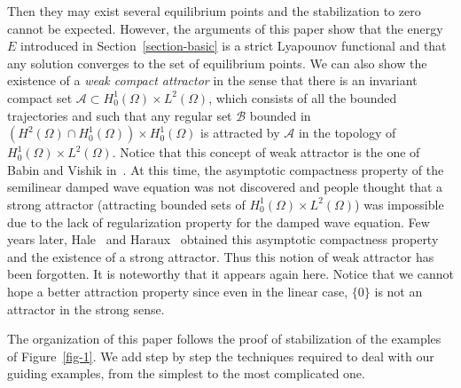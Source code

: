 \documentclass[10pt]{amsart}
\theoremstyle{definition}\newtheorem{defi}[theo]{Definition}\newtheorem{rema}[theo]{Remark}\newtheorem{exam}[theo]{Example}\newtheorem{exem}[theo]{Example}\newtheorem{nota}[theo]{Notation}
\newcommand{\Ac}{\mathcal{A}}
\newcommand{\Bc}{\mathcal{B}}
\begin{document}
\begin{itemize}
Then they may exist several equilibrium points and the stabilization to zero cannot be expected. However, the arguments of this paper show that the energy $E$ introduced in Section~\ref{section-basic} is a strict Lyapounov functional and that any solution converges to the set of equilibrium points. We can also show the existence of a \emph{weak compact attractor} in the sense that there is an invariant compact set $\Ac\subset H^1_0(\Omega)\times L^2(\Omega)$, which consists of all the bounded trajectories and such that any regular set $\Bc$ bounded in $(H^2(\Omega)\cap H^1_0(\Omega))\times H^1_0(\Omega)$ is attracted by $\Ac$ in the topology of $H^1_0(\Omega)\times L^2(\Omega)$. Notice that this concept of weak attractor is the one of Babin and Vishik in~\cite{Babin-Vishik}. At this time, the asymptotic compactness property of the semilinear damped wave equation was not discovered and people thought that a strong attractor (attracting bounded sets of $H^1_0(\Omega)\times L^2(\Omega)$) was impossible due to the lack of regularization property for the damped wave equation. Few years later, Hale~\cite{Hale-book} and Haraux~\cite{Haraux} obtained this asymptotic compactness property and the existence of a strong attractor. Thus this notion of weak attractor has been forgotten. It is noteworthy that it appears again here. Notice that we cannot hope a better attraction property since even in the linear case, $\{0\}$ is not an attractor in the strong sense.
\end{itemize}


The organization of this paper follows the proof of stabilization of the examples of Figure~\ref{fig-1}. We add step by step the techniques required to deal with our guiding examples, from the simplest to the most complicated one.
\end{document}
